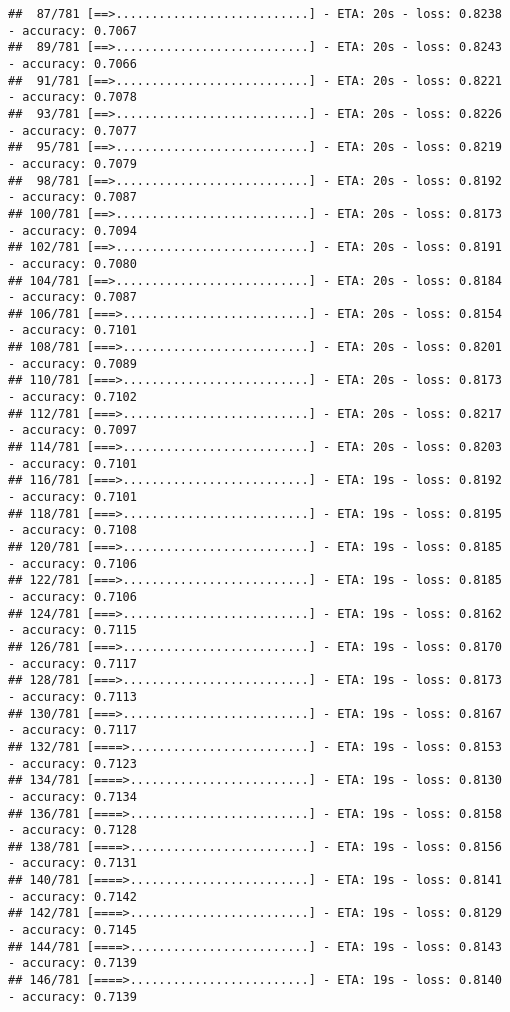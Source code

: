 \documentclass[
]{article}
\begin{document}
\begin{verbatim}
##  87/781 [==>...........................] - ETA: 20s - loss: 0.8238 - accuracy: 0.7067
##  89/781 [==>...........................] - ETA: 20s - loss: 0.8243 - accuracy: 0.7066
##  91/781 [==>...........................] - ETA: 20s - loss: 0.8221 - accuracy: 0.7078
##  93/781 [==>...........................] - ETA: 20s - loss: 0.8226 - accuracy: 0.7077
##  95/781 [==>...........................] - ETA: 20s - loss: 0.8219 - accuracy: 0.7079
##  98/781 [==>...........................] - ETA: 20s - loss: 0.8192 - accuracy: 0.7087
## 100/781 [==>...........................] - ETA: 20s - loss: 0.8173 - accuracy: 0.7094
## 102/781 [==>...........................] - ETA: 20s - loss: 0.8191 - accuracy: 0.7080
## 104/781 [==>...........................] - ETA: 20s - loss: 0.8184 - accuracy: 0.7087
## 106/781 [===>..........................] - ETA: 20s - loss: 0.8154 - accuracy: 0.7101
## 108/781 [===>..........................] - ETA: 20s - loss: 0.8201 - accuracy: 0.7089
## 110/781 [===>..........................] - ETA: 20s - loss: 0.8173 - accuracy: 0.7102
## 112/781 [===>..........................] - ETA: 20s - loss: 0.8217 - accuracy: 0.7097
## 114/781 [===>..........................] - ETA: 20s - loss: 0.8203 - accuracy: 0.7101
## 116/781 [===>..........................] - ETA: 19s - loss: 0.8192 - accuracy: 0.7101
## 118/781 [===>..........................] - ETA: 19s - loss: 0.8195 - accuracy: 0.7108
## 120/781 [===>..........................] - ETA: 19s - loss: 0.8185 - accuracy: 0.7106
## 122/781 [===>..........................] - ETA: 19s - loss: 0.8185 - accuracy: 0.7106
## 124/781 [===>..........................] - ETA: 19s - loss: 0.8162 - accuracy: 0.7115
## 126/781 [===>..........................] - ETA: 19s - loss: 0.8170 - accuracy: 0.7117
## 128/781 [===>..........................] - ETA: 19s - loss: 0.8173 - accuracy: 0.7113
## 130/781 [===>..........................] - ETA: 19s - loss: 0.8167 - accuracy: 0.7117
## 132/781 [====>.........................] - ETA: 19s - loss: 0.8153 - accuracy: 0.7123
## 134/781 [====>.........................] - ETA: 19s - loss: 0.8130 - accuracy: 0.7134
## 136/781 [====>.........................] - ETA: 19s - loss: 0.8158 - accuracy: 0.7128
## 138/781 [====>.........................] - ETA: 19s - loss: 0.8156 - accuracy: 0.7131
## 140/781 [====>.........................] - ETA: 19s - loss: 0.8141 - accuracy: 0.7142
## 142/781 [====>.........................] - ETA: 19s - loss: 0.8129 - accuracy: 0.7145
## 144/781 [====>.........................] - ETA: 19s - loss: 0.8143 - accuracy: 0.7139
## 146/781 [====>.........................] - ETA: 19s - loss: 0.8140 - accuracy: 0.7139

\end{verbatim}
\end{document}

